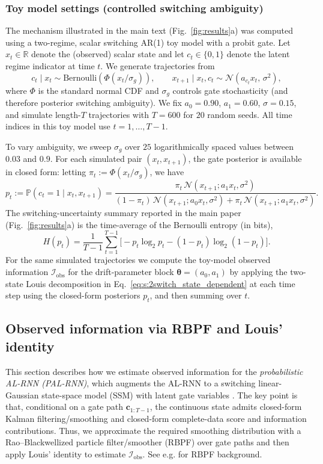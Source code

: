 \documentclass[twoside]{article}
\theoremstyle{plain}
\theoremstyle{definition}
\theoremstyle{remark}
\newcommand{\Io}{\bm{\mathcal{I}}_{\mathrm{obs}}}
\begin{document}
\subsubsection{Toy model settings (controlled switching ambiguity)}
The mechanism illustrated in the main text (Fig.~\ref{fig:results}a) was computed using a two-regime, scalar switching AR(1) toy model with a probit gate. Let $x_t\in\mathbb{R}$ denote the (observed) scalar state and let $c_t\in\{0,1\}$ denote the latent regime indicator at time $t$.
We generate trajectories from
\begin{equation}
c_t\mid x_t \sim \mathrm{Bernoulli}\!\left(\Phi\!\left(x_t/\sigma_g\right)\right),\qquad
x_{t+1}\mid x_t,c_t \sim \mathcal{N}\!\left(a_{c_t}x_t,\,\sigma^2\right),
\end{equation}
where $\Phi$ is the standard normal CDF and $\sigma_g$ controls gate stochasticity (and therefore posterior switching ambiguity).
We fix $a_0=0.90$, $a_1=0.60$, $\sigma=0.15$, and simulate length-$T$ trajectories with $T=600$ for $20$ random seeds.
All time indices in this toy model use $t=1,\dots,T-1$.

To vary ambiguity, we sweep $\sigma_g$ over $25$ logarithmically spaced values between $0.03$ and $0.9$.
For each simulated pair $(x_t,x_{t+1})$, the gate posterior is available in closed form:
letting $\pi_t:=\Phi(x_t/\sigma_g)$, we have
\begin{equation}
p_t:=\mathbb{P}(c_t=1\mid x_t,x_{t+1})
=\frac{\pi_t\,\mathcal{N}(x_{t+1};a_1x_t,\sigma^2)}{(1-\pi_t)\,\mathcal{N}(x_{t+1};a_0x_t,\sigma^2)+\pi_t\,\mathcal{N}(x_{t+1};a_1x_t,\sigma^2)}.
\end{equation}
The switching-uncertainty summary reported in the main paper (Fig.~\ref{fig:results}a) is the time-average of the Bernoulli entropy (in bits),
\begin{equation}
H(p_t) = \frac{1}{T-1}\sum_{t=1}^{T-1}\big[-p_t\log_2 p_t-(1-p_t)\log_2(1-p_t)\big].
\end{equation}
For the same simulated trajectories we compute the toy-model observed information $\Io$ for the drift-parameter block $\bm\theta=(a_0,a_1)$ by applying the two-state Louis decomposition in Eq.~\eqref{eq:s:2switch_state_dependent} at each time step using the closed-form posteriors $p_t$, and then summing over $t$.
\subsection{Observed information via RBPF and Louis' identity}
\label{sec:s:rbpf_louis_details}
This section describes how we estimate observed information for the \emph{probabilistic AL-RNN (PAL-RNN)}, which augments the AL-RNN to a switching linear-Gaussian state-space model (SSM) with latent gate variables \citep{durbin2001ssm}. The key point is that, conditional on a gate path $\bm c_{1:T-1}$, the continuous state admits closed-form Kalman filtering/smoothing and closed-form complete-data score and information contributions. Thus, we approximate the required smoothing distribution with a Rao--Blackwellized particle filter/smoother (RBPF) over gate paths and then apply Louis' identity to estimate $\Io$. See e.g. \citet{doucet2000rbpf} for RBPF background.
\end{document}
